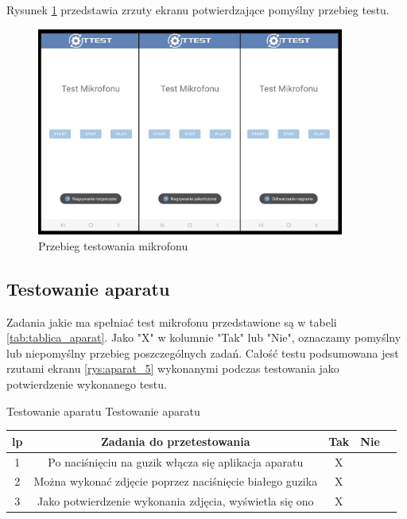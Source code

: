 Rysunek \ref{rys:mikrofon_5} przedstawia zrzuty ekranu potwierdzające pomyślny przebieg testu.

\begin{figure}[!hbt]
	\begin{center}
		\includegraphics[angle=360, width=0.90\textwidth]{rys/punkt5/mikrofon.png}
		\caption{Przebieg testowania mikrofonu}
		\label{rys:mikrofon_5}
	\end{center}
\end{figure} 

\newpage


\subsection{Testowanie aparatu}

\hspace{0.60cm}Zadania jakie ma spełniać test mikrofonu przedstawione są w tabeli \ref{tab:tablica_aparat}. Jako "X" w kolumnie "Tak" lub "Nie", oznaczamy pomyślny lub niepomyślny przebieg poszczególnych zadań. Całość testu podsumowana jest rzutami ekranu \ref{rys:aparat_5} wykonanymi podczas testowania jako potwierdzenie wykonanego testu.

\begin{tabela}
	{Testowanie aparatu}	%
	{Testowanie aparatu}	%
	{
		\begin{tabular}{|c|c|c|c|c|} \hline
			\textbf{lp} & \textbf{Zadania do przetestowania} & \textbf{Tak} & \textbf{Nie} \\ \hline
			1 & Po naciśnięciu na guzik włącza się aplikacja aparatu & X & ~ \\ \hline
			2 & Można wykonać zdjęcie poprzez naciśnięcie białego guzika & X & ~ \\ \hline
			3 & Jako potwierdzenie wykonania zdjęcia, wyświetla się ono & X & ~ \\ \hline
	\end{tabular}	}
	\label{tab:tablica_aparat}
\end{tabela}

